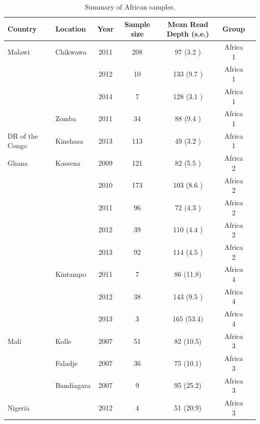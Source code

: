 \documentclass[9pt,lineno]{elife}
\begin{document}
\begin{table}[bt]
  \caption{Summary of African samples.}\label{tab:Pf3ksamples}
\begin{tabular}{l l c c c c c}
\toprule
Country & Location & Year & Sample size & Mean Read Depth (s.e.) & Group \\
\midrule
Malawi          &Chikwawa       &2011 &208  &97   (3.2 )&Africa 1\\
                &               &2012 &10   &133  (9.7 )&Africa 1\\
                &               &2014 &7    &128  (3.1 )&Africa 1\\
                &Zomba          &2011 &34   &88   (9.4 )&Africa 1\\
 \hline
DR of the Congo &Kinshasa       &2013 &113  &49   (3.2 )&Africa 1\\
 \hline
Ghana           &Kassena        &2009 &121  &82   (5.5 )&Africa 2\\
                &               &2010 &173  &103  (8.6 )&Africa 2\\
                &               &2011 &96   &72   (4.3 )&Africa 2\\
                &               &2012 &39   &110  (4.4 )&Africa 2\\
                &               &2013 &92   &114  (4.5 )&Africa 2\\
                &Kintampo       &2011 &7    &86   (11.8)&Africa 4\\
                &               &2012 &38   &143  (9.5 )&Africa 4\\
                &               &2013 &3    &165  (53.4)&Africa 4\\
 \hline
Mali            &Kolle          &2007 &51   &82   (10.5)&Africa 3\\
                &Faladje        &2007 &36   &75   (10.1)&Africa 3\\
                &Bandiagara     &2007 &9    &95   (25.2)&Africa 3\\
 \hline
Nigeria         &               &2012 &4    &51   (20.9)&Africa 3\\


\end{tabular}
\end{table}
\end{document}
